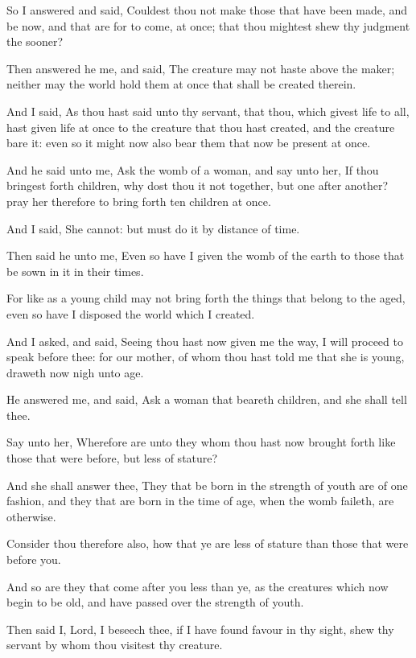 {\par }{\PP {}So I answered and said, Couldest thou not make those that have been made, and be now, and that are for to come, at once; that thou mightest shew thy judgment the sooner?
\par }{\PP {}Then answered he me, and said, The creature may not haste above the maker; neither may the world hold them at once that shall be created therein.
\par }{\PP {}And I said, As thou hast said unto thy servant, that thou, which givest life to all, hast given life at once to the creature that thou hast created, and the creature bare it: even so it might now also bear them that now be present at once.
\par }{\PP {}And he said unto me, Ask the womb of a woman, and say unto her, If thou bringest forth children, why dost thou it not together, but one after another? pray her therefore to bring forth ten children at once.
\par }{\PP {}And I said, She cannot: but must do it by distance of time.
\par }{\PP {}Then said he unto me, Even so have I given the womb of the earth to those that be sown in it in their times.
\par }{\PP {}For like as a young child may not bring forth the things that belong to the aged, even so have I disposed the world which I created.
\par }{\PP {}And I asked, and said, Seeing thou hast now given me the way, I will proceed to speak before thee: for our mother, of whom thou hast told me that she is young, draweth now nigh unto age.
\par }{\PP {}He answered me, and said, Ask a woman that beareth children, and she shall tell thee.
\par }{\PP {}Say unto her, Wherefore are unto they whom thou hast now brought forth like those that were before, but less of stature?
\par }{\PP {}And she shall answer thee, They that be born in the strength of youth are of one fashion, and they that are born in the time of age, when the womb faileth, are otherwise.
\par }{\PP {}Consider thou therefore also, how that ye are less of stature than those that were before you.
\par }{\PP {}And so are they that come after you less than ye, as the creatures which now begin to be old, and have passed over the strength of youth.
\par }{\PP {}Then said I, Lord, I beseech thee, if I have found favour in thy sight, shew thy servant by whom thou visitest thy creature.

}
